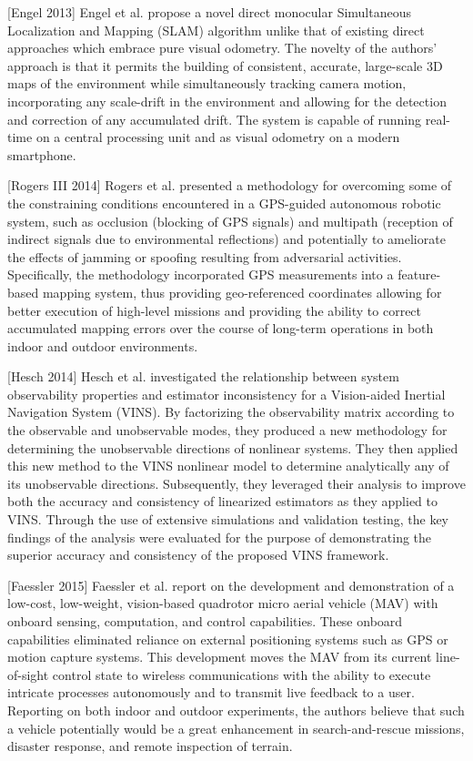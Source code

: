 [Engel 2013] Engel et al. propose a novel direct monocular Simultaneous Localization and Mapping (SLAM) algorithm unlike that of existing direct approaches which embrace pure visual odometry. The novelty of the authors' approach is that it permits the building of consistent, accurate, large-scale 3D maps of the environment while simultaneously tracking camera motion, incorporating any scale-drift in the environment and allowing for the detection and correction of any accumulated drift. The system is capable of running real-time on a central processing unit and as visual odometry on a modern smartphone.

[Rogers III 2014] Rogers et al. presented a methodology for overcoming some of the constraining conditions encountered in a GPS-guided autonomous robotic system, such as occlusion (blocking of GPS signals) and multipath (reception of indirect signals due to environmental reflections) and potentially to ameliorate the effects of jamming or spoofing resulting from adversarial activities. Specifically, the methodology incorporated GPS measurements into a feature-based mapping system, thus providing geo-referenced coordinates allowing for better execution of high-level missions and providing the ability to correct accumulated mapping errors over the course of long-term operations in both indoor and outdoor environments.

[Hesch 2014] Hesch et al. investigated the relationship between system observability properties and estimator inconsistency for a Vision-aided Inertial Navigation System (VINS). By factorizing the observability matrix according to the observable and unobservable modes, they produced a new methodology for determining the unobservable directions of nonlinear systems. They then applied this new method to the VINS nonlinear model to determine analytically any of its unobservable directions. Subsequently, they leveraged their analysis to improve both the accuracy and consistency of linearized estimators as they applied to VINS. Through the use of extensive simulations and validation testing, the key findings of the analysis were evaluated for the purpose of demonstrating the superior accuracy and consistency of the proposed VINS framework.

[Faessler 2015] Faessler et al. report on the development and demonstration of a low-cost, low-weight, vision-based quadrotor micro aerial vehicle (MAV) with onboard sensing, computation, and control capabilities. These onboard capabilities eliminated reliance on external positioning systems such as GPS or motion capture systems. This development moves the MAV from its current line-of-sight control state to wireless communications with the ability to execute intricate processes autonomously and to transmit live feedback to a user. Reporting on both indoor and outdoor experiments, the authors believe that such a vehicle potentially would be a great enhancement in search-and-rescue missions, disaster response, and remote inspection of terrain. 

